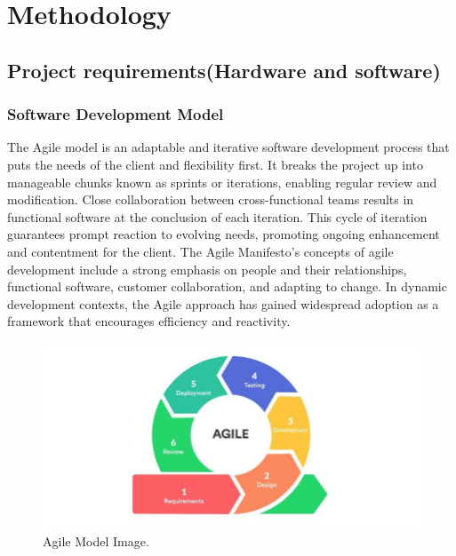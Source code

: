     \chapter{Methodology}



              
        \section{Project requirements(Hardware and software)}
        \subsection{Software Development Model}
 The Agile model is an adaptable and iterative software development process that puts the needs of the client and flexibility first. It breaks the project up into manageable chunks known as sprints or iterations, enabling regular review and modification. Close collaboration between cross-functional teams results in functional software at the conclusion of each iteration. This cycle of iteration guarantees prompt reaction to evolving needs, promoting ongoing enhancement and contentment for the client. The Agile Manifesto's concepts of agile development include a strong emphasis on people and their relationships, functional software, customer collaboration, and adapting to change. In dynamic development contexts, the Agile approach has gained widespread adoption as a framework that encourages efficiency and reactivity.
 \begin{figure}[h]
	\centering
	\includegraphics[scale=0.6]{img/Agile_model.png}
	\caption{Agile Model Image.\\   %
}
 
	\end{figure}
	
